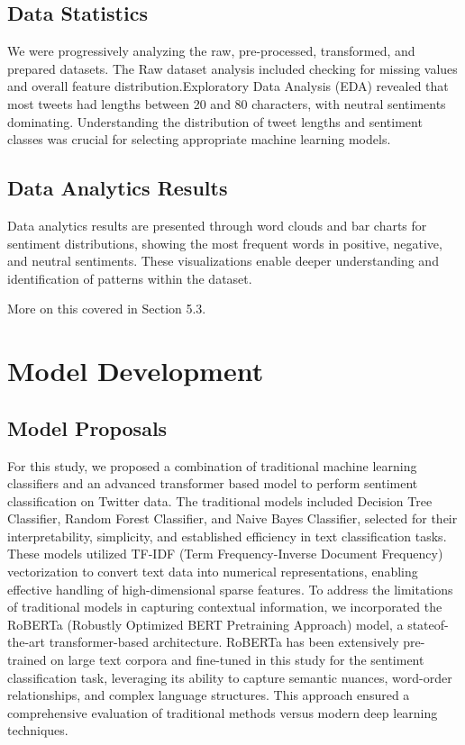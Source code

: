 \documentclass[journal]{IEEEtran}
\begin{document}
\subsection{\textbf{Data Statistics}}
We were progressively analyzing the raw, pre-processed, transformed, and prepared datasets. The Raw dataset analysis included checking for missing values and overall feature distribution.Exploratory Data Analysis (EDA) revealed that most tweets had lengths between 20 and 80 characters, with neutral sentiments dominating. Understanding the distribution of tweet lengths and sentiment classes was crucial for selecting appropriate machine learning models. 

\subsection{\textbf{Data Analytics Results}}
Data analytics results are presented through word clouds and bar charts for sentiment distributions, showing the most frequent words in positive, negative, and neutral sentiments. These visualizations enable deeper understanding and identification of patterns within the dataset.

More on this covered in Section 5.3.

\section{\textbf{Model Development}}

\subsection{\textbf{Model Proposals}}
For this study, we proposed a combination of traditional machine learning classifiers and an advanced transformer based model to perform sentiment classification on Twitter data. The traditional models included Decision Tree Classifier, Random Forest Classifier, and Naive Bayes Classifier, selected for their interpretability, simplicity, and established efficiency in text classification tasks. These models utilized TF-IDF (Term Frequency-Inverse Document Frequency) vectorization to convert text data into numerical representations, enabling effective handling of high-dimensional sparse features. To address the limitations of traditional models in capturing contextual information, we incorporated the RoBERTa (Robustly Optimized BERT Pretraining Approach) model, a stateof-the-art transformer-based architecture. RoBERTa has been extensively pre-trained on large text corpora and fine-tuned in this study for the sentiment classification task, leveraging its ability to capture semantic nuances, word-order relationships, and complex language structures. This approach ensured a comprehensive evaluation of traditional methods versus modern deep learning techniques. 
\end{document}
